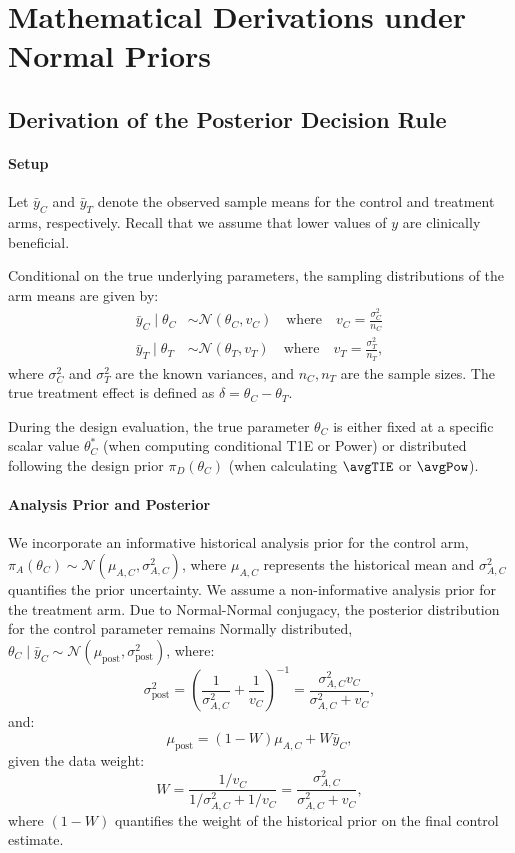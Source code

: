 \appendix
\section{Mathematical Derivations under Normal Priors}
\label{sec:appendix_normal_priors}

\subsection{Derivation of the Posterior Decision Rule}

\paragraph{Setup}
Let $\bar{y}_C$ and $\bar{y}_T$ denote the observed sample means for the control and treatment arms, respectively. Recall that we assume that lower values of $y$ are clinically beneficial.  

Conditional on the true underlying parameters, the sampling distributions of the arm means are given by:
\begin{align*}
    \bar{y}_C \mid \theta_C &\sim \mathcal{N}(\theta_C, v_C) \quad \text{where} \quad v_C = \frac{\sigma_C^2}{n_C}  \\
    \bar{y}_T \mid \theta_T &\sim \mathcal{N}(\theta_T, v_T) \quad \text{where} \quad v_T = \frac{\sigma_T^2}{n_T}, 
\end{align*}
where $\sigma_C^2$ and $\sigma_T^2$ are the known variances, and $n_C, n_T$ are the sample sizes. The true treatment effect is defined as $\delta = \theta_C - \theta_T$. 

During the design evaluation, the true parameter $\theta_C$ is either fixed at a specific scalar value $\theta_C^*$ (when computing conditional T1E or Power) or distributed following the design prior $\pi_D(\theta_C)$ (when calculating $\avgTIE$ or $\avgPow$).


\paragraph{Analysis Prior and Posterior}
We incorporate an informative historical analysis prior for the control arm, $\pi_A(\theta_C) \sim \mathcal{N}(\mu_{A,C}, \sigma_{A,C}^2)$, where $\mu_{A,C}$ represents the historical mean and $\sigma_{A,C}^2$ quantifies the prior uncertainty. We assume a non-informative analysis prior for the treatment arm.
Due to Normal-Normal conjugacy, the posterior distribution for the control parameter remains Normally distributed, $\theta_C \mid \bar{y}_C \sim \mathcal{N}(\mu_{\text{post}}, \sigma_{\text{post}}^2)$, where:
$$
    \sigma_{\text{post}}^2 = \left( \frac{1}{\sigma_{A,C}^2} + \frac{1}{v_C} \right)^{-1} = \frac{\sigma_{A,C}^2 v_C}{\sigma_{A,C}^2 + v_C},
$$
and: 
$$
    \mu_{\text{post}} = (1 - W)\mu_{A,C} + W\bar{y}_C,
$$
given the data weight: 
$$
    W = \frac{1/v_C}{1/\sigma_{A,C}^2 + 1/v_C} = \frac{\sigma_{A,C}^2}{\sigma_{A,C}^2 + v_C},
$$
where $(1 - W)$ quantifies the weight of the historical prior on the final control estimate. 

